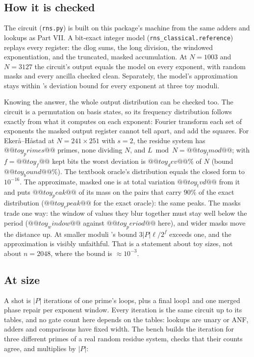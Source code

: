 \subsection{How it is checked}

The circuit (\texttt{rns.py}) is built on this package's machine from the same adders and lookups
as Part VII. A bit-exact integer model (\texttt{rns\_classical.reference}) replays every register:
the dlog sums, the long division, the windowed exponentiation, and the truncated, masked
accumulation. At $N=1003$ and $N=3127$ the circuit's output equals the model on every exponent,
with random masks and every ancilla checked clean. Separately, the model's approximation stays
within \cite{ec:gidney25rsa}'s deviation bound for every exponent at three toy moduli.

Knowing the answer, the whole output distribution can be checked too. The circuit is a permutation
on basis states, so its frequency distribution follows exactly from what it computes on each
exponent: Fourier transform each set of exponents the masked output register cannot tell apart,
and add the squares. For Eker\aa{}--H\aa{}stad at $N=241\times251$ with $s=2$, the residue system
has $@@toy_primes@@$ primes, none dividing $N$, and $L\bmod N=@@toy_lmod@@$; with $f=@@toy_f@@$ kept
bits the worst deviation is $@@toy_dev@@\%$ of $N$ (bound $@@toy_bound@@\%$). The textbook oracle's
distribution equals the closed form to $10^{-16}$. The approximate, masked one is at total variation
$@@toy_tvd@@$ from it and puts $@@toy_peak@@$ of its mass on the pairs that carry $90\%$ of the exact
distribution ($@@toy_epeak@@$ for the exact oracle): the same peaks. The masks trade one way: the
window of values they blur together must stay well below the period ($@@toy_window@@$ against
$@@toy_period@@$ here), and wider masks move the distance up. At smaller moduli
\cite{ec:gidney25rsa}'s bound $3|P|\ell/2^f$ exceeds one, and the approximation is visibly
unfaithful. That is a statement about toy sizes, not about $n=2048$, where the bound is
$\approx10^{-3}$.

\subsection{At size}

A shot is $|P|$ iterations of one prime's loops, plus a final loop1 and one merged phase repair
per exponent window. Every iteration is the same circuit up to its tables, and no gate count here
depends on the tables: lookups are unary or ANF, adders and comparisons have fixed width. The
bench builds the iteration for three different primes of a real random residue system, checks
that their counts agree, and multiplies by $|P|$:

